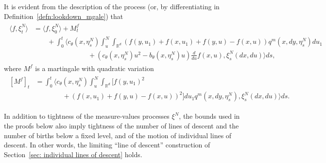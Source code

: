 \documentclass[12pt]{article}
\newcommand{\IR}{\mathbb R}
\newcommand{\lp}{\xi}              %
\numberwithin{equation}{section}
\begin{document}
It is evident from the description of the process
(or, by differentiating in Definition~\ref{defn:lookdown_mgale})
that
\begin{align} \label{eqn:f_xi_mgale}
\begin{split}
    \langle f, \lp_t^N \rangle
    &=
    \langle f, \lp_0^N \rangle
    + M^f_t
\\ & \qquad {}
    +
    \int_0^t
    \bigg\langle
        c_\theta(x, \eta^N_s)
        \int_u^N \int_{\IR^d}
        \left(
            f(y, u_1) + f(x, u_1) + f(y, u) - f(x, u)
        \right)
        q^m(x, dy, \eta^N_s) du_1 
\\ & \qquad \qquad \qquad \qquad {}
        +
        \left(
            c_\theta(x, \eta^N_s) u^2
            - b_\theta(x, \eta^N_s) u
        \right)
        \frac{d}{du} f(x, u)
    ,
    \lp_s^N(dx, du) \bigg \rangle
    ds ,
\end{split}
\end{align}
where $M^f$ is a martingale
with quadratic variation
\begin{align} \label{eqn:f_xi_qv}
    \begin{split}
    [M^f]_t
    &=
    \int_0^t
    \bigg \langle c_\theta(x, \eta_s^N) \int_u^N \int_{\IR^d}
        \big[ f(y, u_1)^2
\\&\qquad \qquad {}
        + \left( f(x, u_1) + f(y, u) - f(x, u) \right)^2 \big]
    du_1 q^m(x, dy, \eta^N_s)
    ,
    \lp_s^N(dx, du) \bigg \rangle
    ds .
\end{split}\end{align}

In addition to tightness of the measure-values processes $\lp^N$,
the bounds used in the proofs below also imply
tightness of the number of lines of descent and the number of births below a fixed level,
and of the motion of individual lines of descent.
In other words, the limiting ``line of descent'' construction
of Section~\ref{sec: individual lines of descent} holds.
\end{document}
